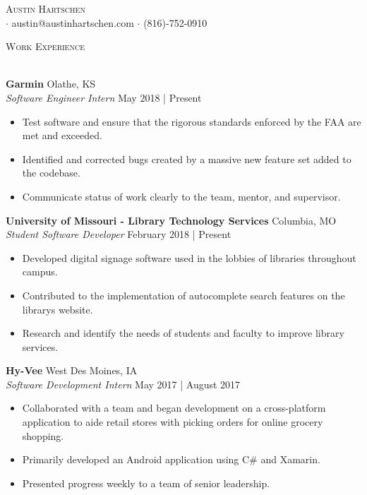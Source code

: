 \documentclass[a4paper]{article}
\newcommand{\lineunder} {
    \vspace*{-8pt} \\
    \hspace*{-18pt} \hrulefill \\
}
\newcommand{\header} [1] {
    {\hspace*{-18pt}\vspace*{6pt} \textsc{#1}}
    \vspace*{-6pt} \lineunder
}
\begin{document}
\vspace*{-40pt}

\vspace*{-10pt}
\begin{center}
	{\Huge \scshape {Austin Hartschen}}\\
	$\cdot$ austin@austinhartschen.com $\cdot$ (816)-752-0910\\
\end{center}

\header{Work Experience}
\vspace{1mm}

\textbf{Garmin} \hfill Olathe, KS\\
\textit{Software Engineer Intern} \hfill May 2018 | Present\\
\vspace{-1mm}
\begin{itemize} \itemsep 1pt
	\item Test software and ensure that the rigorous standards enforced by the FAA are met and exceeded.
	\item Identified and corrected bugs created by a massive new feature set added to the codebase.
	\item Communicate status of work clearly to the team, mentor, and supervisor.
\end{itemize}
\textbf{University of Missouri - Library Technology Services} \hfill Columbia, MO\\
\textit{Student Software Developer} \hfill February 2018 | Present\\
\vspace{-1mm}
\begin{itemize} \itemsep 1pt
	\item Developed digital signage software used in the lobbies of libraries throughout campus.
	\item Contributed to the implementation of autocomplete search features on the library\textquotesingle{}s website.
	\item Research and identify the needs of students and faculty to improve library services.
\end{itemize}
\textbf{Hy-Vee} \hfill West Des Moines, IA\\
\textit{Software Development Intern} \hfill May 2017 | August 2017\\
\vspace{-1mm}
\begin{itemize} \itemsep 1pt
	\item Collaborated with a team and began development on a cross-platform application to aide retail stores with picking orders for online grocery shopping.
	\item Primarily developed an Android application using C\# and Xamarin.
	\item Presented progress weekly to a team of senior leadership.
\end{itemize}
\end{document}
